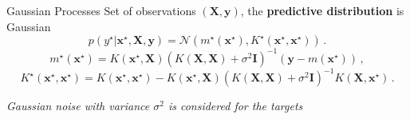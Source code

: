 \documentclass[aspectratio=149]{beamer}
\begin{document}
    \begin{frame}{Gaussian Processes}
    Set of observations \((\mathbf{X}, \mathbf{y})\), the \textbf{predictive distribution} is Gaussian
        \[
        p(y^\star | \mathbf{x}^\star, \mathbf{X}, \mathbf{y}) = \mathcal{N}(m^\star(\mathbf{x}^\star), K^\star(\mathbf{x}^\star, \mathbf{x}^\star))\,.
        \]
        \pause
        \[
        m^\star(\mathbf{x}^\star) = K(\mathbf{x}^\star, \mathbf{X})(K(\mathbf{X}, \mathbf{X}) + \sigma^2 \bm{I})^{-1}(\mathbf{y} - m(\mathbf{x}^\star))\,,
        \]
        \[
        K^\star(\mathbf{x}^\star, \mathbf{x}^\star) = K(\mathbf{x}^\star, \mathbf{x}^\star) - K(\mathbf{x}^\star, \mathbf{X})(K(\mathbf{X}, \mathbf{X}) + \sigma^2 \bm{I})^{-1}K(\mathbf{X},  \mathbf{x}^\star)\,.
        \]
        \begin{center}
            \emph{Gaussian noise with variance \(\sigma^2\) is considered for the targets}
        \end{center}
    \end{frame}
\end{document}
